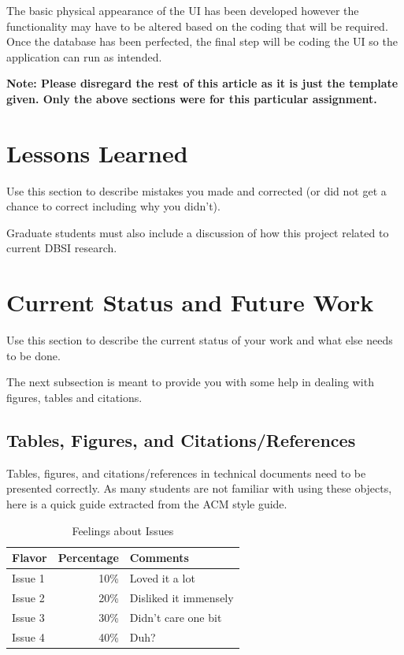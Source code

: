 \documentclass{sig-alternate}
\begin{document}
The basic physical appearance of the UI has been developed however the functionality may have to be altered 
based on the coding that will be required. Once the database has been perfected, the final step will be 
coding the UI so the application can run as intended. 

{\bf Note: Please disregard the rest of this article as it is just
the template given. Only the above sections were 
for this particular assignment.}


\section{Lessons Learned}
\label{mistakes}

Use this section to describe mistakes you made and corrected (or did
not get a chance to correct including why you didn't).

Graduate students must also include a discussion of how this project
related to current DBSI research.

\section{Current Status and Future Work}
\label{current status}

Use this section to describe the current status of your work
and what else needs to be done.

The next subsection is meant to provide you with some help
in dealing with figures, tables and citations.

\subsection{Tables, Figures, and Citations/References}

Tables, figures, and citations/references in technical
documents need to be presented correctly. As many students
are not familiar with using these objects, here is a quick
guide extracted from the ACM style guide.

\begin{table}
\centering
\caption{Feelings about Issues}
\begin{tabular}{|l|r|l|} \hline
Flavor&Percentage&Comments\\ \hline
Issue 1 &  10\% & Loved it a lot\\ \hline
Issue 2 &  20\% & Disliked it immensely\\ \hline
Issue 3 &  30\% & Didn't care one bit\\ \hline
Issue 4 &  40\% & Duh?\\ \hline
\end{tabular}
\end{table}
\end{document}
